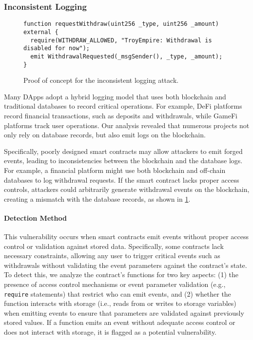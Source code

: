 \subsubsection{Inconsistent Logging}\label{vec:attack2}

\begin{figure}
\footnotesize
\small
\begin{lstlisting}[language=Solidity]
function requestWithdraw(uint256 _type, uint256 _amount) external {
  require(WITHDRAW_ALLOWED, "TroyEmpire: Withdrawal is disabled for now");
  emit WithdrawalRequested(_msgSender(), _type, _amount);
}
\end{lstlisting}
\caption{Proof of concept for the inconsistent logging attack.}\label{code:2}
\end{figure}

Many DApps adopt a hybrid logging model that uses both blockchain and traditional databases to record critical operations. For example, DeFi platforms record financial transactions, such as deposits and withdrawals, while GameFi platforms track user operations. Our analysis revealed that numerous projects not only rely on database records, but also emit logs on the blockchain.

Specifically, poorly designed smart contracts may allow attackers to emit forged events, leading to inconsistencies between the blockchain and the database logs. For example, a financial platform might use both blockchain and off-chain databases to log withdrawal requests. If the smart contract lacks proper access controls, attackers could arbitrarily generate withdrawal events on the blockchain, creating a mismatch with the database records, as shown in \cref{code:2}.


\paragraph{Detection Method}
This vulnerability occurs when smart contracts emit events without proper access control or validation against stored data. Specifically, some contracts lack necessary constraints, allowing any user to trigger critical events such as withdrawals without validating the event parameters against the contract's state. To detect this, we analyze the contract's functions for two key aspects: (1) the presence of access control mechanisms or event parameter validation (e.g., \texttt{require} statements) that restrict who can emit events, and (2) whether the function interacts with storage (i.e., reads from or writes to storage variables) when emitting events to ensure that parameters are validated against previously stored values. If a function emits an event without adequate access control or does not interact with storage, it is flagged as a potential vulnerability.

